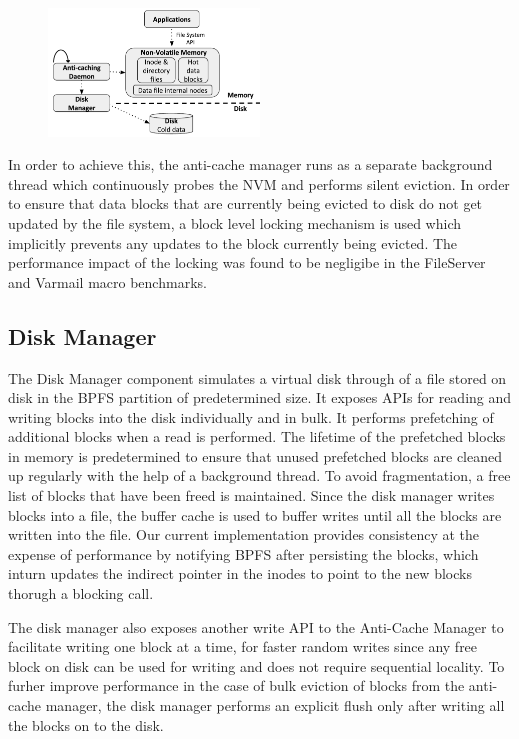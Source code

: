 \begin{figure}
\centering
\vspace{-0.2in}
\includegraphics[width=0.5\textwidth]{figs/bpfs.pdf}
\vspace{-0.2in}
\end{figure}

In order to achieve this, the anti-cache manager runs as a separate background thread which continuously probes the NVM and performs silent eviction. In order to ensure that data blocks that are currently being evicted to disk do not get updated by the file system, a block level locking mechanism is used which implicitly prevents any updates to the block currently being evicted. The performance impact of the locking was found to be negligibe in the FileServer and Varmail macro benchmarks. 

\subsection{Disk Manager}
The Disk Manager component simulates a virtual disk through of a file stored on disk in the BPFS partition of predetermined size. It exposes APIs for reading and writing blocks into the disk individually and in bulk. It performs prefetching of additional blocks when a read is performed. The lifetime of the prefetched blocks in memory is predetermined to ensure that unused prefetched blocks are cleaned up regularly with the help of a background thread. To avoid fragmentation, a free list of blocks that have been freed is maintained. Since the disk manager writes blocks into a file, the buffer cache is used to buffer writes until all the blocks are written into the file. Our current implementation provides consistency at the expense of performance by notifying BPFS after persisting the blocks, which inturn updates the indirect pointer in the inodes to point to the new blocks thorugh a blocking call.

The disk manager also exposes another write API to the Anti-Cache Manager to facilitate writing one block at a time, for faster random writes since any free block on disk can be used for writing and does not require sequential locality. To furher improve performance in the case of bulk eviction of blocks from the anti-cache manager, the disk manager performs an explicit flush only after writing all the blocks on to the disk.

